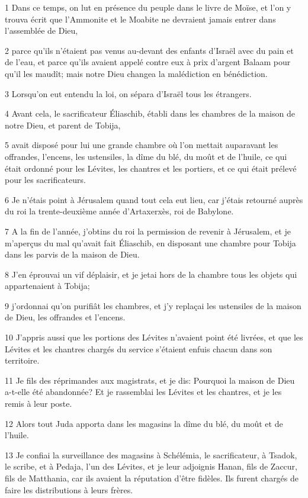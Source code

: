 \par 1 Dans ce temps, on lut en présence du peuple dans le livre de Moïse, et l'on y trouva écrit que l'Ammonite et le Moabite ne devraient jamais entrer dans l'assemblée de Dieu,
\par 2 parce qu'ils n'étaient pas venus au-devant des enfants d'Israël avec du pain et de l'eau, et parce qu'ils avaient appelé contre eux à prix d'argent Balaam pour qu'il les maudît; mais notre Dieu changea la malédiction en bénédiction.
\par 3 Lorsqu'on eut entendu la loi, on sépara d'Israël tous les étrangers.
\par 4 Avant cela, le sacrificateur Éliaschib, établi dans les chambres de la maison de notre Dieu, et parent de Tobija,
\par 5 avait disposé pour lui une grande chambre où l'on mettait auparavant les offrandes, l'encens, les ustensiles, la dîme du blé, du moût et de l'huile, ce qui était ordonné pour les Lévites, les chantres et les portiers, et ce qui était prélevé pour les sacrificateurs.
\par 6 Je n'étais point à Jérusalem quand tout cela eut lieu, car j'étais retourné auprès du roi la trente-deuxième année d'Artaxerxès, roi de Babylone.
\par 7 A la fin de l'année, j'obtins du roi la permission de revenir à Jérusalem, et je m'aperçus du mal qu'avait fait Éliaschib, en disposant une chambre pour Tobija dans les parvis de la maison de Dieu.
\par 8 J'en éprouvai un vif déplaisir, et je jetai hors de la chambre tous les objets qui appartenaient à Tobija;
\par 9 j'ordonnai qu'on purifiât les chambres, et j'y replaçai les ustensiles de la maison de Dieu, les offrandes et l'encens.
\par 10 J'appris aussi que les portions des Lévites n'avaient point été livrées, et que les Lévites et les chantres chargés du service s'étaient enfuis chacun dans son territoire.
\par 11 Je fils des réprimandes aux magistrats, et je dis: Pourquoi la maison de Dieu a-t-elle été abandonnée? Et je rassemblai les Lévites et les chantres, et je les remis à leur poste.
\par 12 Alors tout Juda apporta dans les magasins la dîme du blé, du moût et de l'huile.
\par 13 Je confiai la surveillance des magasins à Schélémia, le sacrificateur, à Tsadok, le scribe, et à Pedaja, l'un des Lévites, et je leur adjoignis Hanan, fils de Zaccur, fils de Matthania, car ils avaient la réputation d'être fidèles. Ils furent chargés de faire les distributions à leurs frères.
